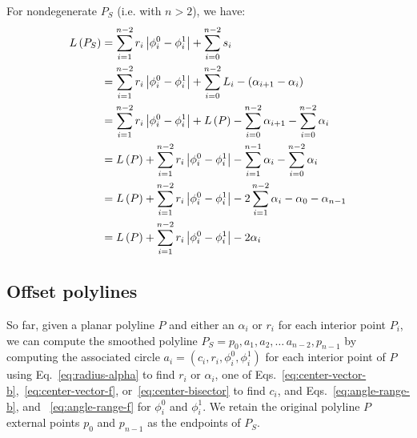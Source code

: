 \documentclass{article}
\begin{document}
For nondegenerate $P_S$ (i.e. with $n>2$), we have:
%
\begin{align}
  \notag
  L\left(P_S\right) &= \sum^{n-2}_{i = 1} r_i\left|\phi^0_i - \phi^1_i\right| + \sum^{n-2}_{i=0} s_i\\
  \notag
  &= \sum^{n-2}_{i = 1} r_i\left|\phi^0_i - \phi^1_i\right| + \sum^{n-2}_{i=0} L_i - (\alpha_{i+1} - \alpha_{i})\\
  \notag
  &= \sum^{n-2}_{i = 1} r_i\left|\phi^0_i - \phi^1_i\right| + L\left(P\right) - \sum^{n-2}_{i=0} \alpha_{i+1} - \sum^{n-2}_{i=0} \alpha_{i}\\
  \notag
  &= L\left(P\right) + \sum^{n-2}_{i = 1} r_i\left|\phi^0_i - \phi^1_i\right| - \sum^{n-1}_{i=1} \alpha_{i} - \sum^{n-2}_{i=0} \alpha_{i}\\
  \notag
  &= L\left(P\right) + \sum^{n-2}_{i = 1} r_i\left|\phi^0_i - \phi^1_i\right| - 2\sum^{n-2}_{i=1} \alpha_{i} - \alpha_0 - \alpha_{n-1}\\
  \label{eq:smoothpoly-len}
  &= L\left(P\right) + \sum^{n-2}_{i = 1} r_i\left|\phi^0_i - \phi^1_i\right| - 2\alpha_i
\end{align}
%
\subsection{Offset polylines}
\label{sec:offset-polylines}
%
So far, given a planar polyline $P$ and either an $\alpha_i$ or $r_i$ for each interior point $P_i$, we can compute the smoothed polyline $P_S = p_0, a_1, a_2,\ldots\,a_{n-2}, p_{n-1}$ by computing the associated circle $a_i=\left(c_i, r_i, \phi^0_i, \phi^1_i\right)$ for each interior point of $P$ using Eq.~\eqref{eq:radius-alpha} to find $r_i$ or $\alpha_i$, one of Eqs.~\eqref{eq:center-vector-b},~\eqref{eq:center-vector-f}, or~\eqref{eq:center-bisector} to find $c_i$, and Eqs.~\eqref{eq:angle-range-b}, and ~\eqref{eq:angle-range-f} for $\phi^0_i$ and $\phi^1_i$.  We retain the original polyline $P$ external points $p_0$ and $p_{n-1}$ as the endpoints of $P_S$.
\end{document}
